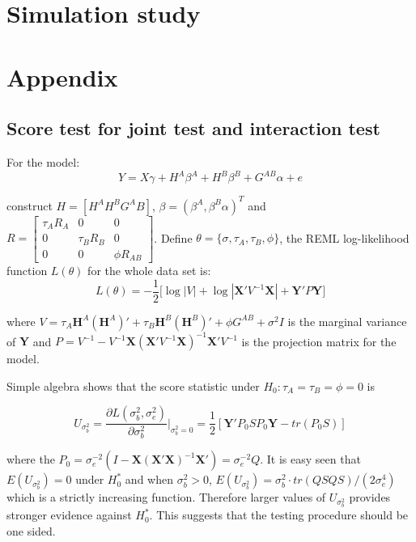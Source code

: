 \documentclass{article}
\newcommand{\Y}{\mathbf{Y}}
\newcommand{\X}{\mathbf{X}}
\newcommand{\HH}{\mathbf{H}}
\begin{document}
    \section{Simulation study}



    \section{Appendix}

        \subsection{Score test for joint test and interaction test}

            For the model:
            \begin{equation*}
                Y=X\gamma+H^A\beta^A+H^B\beta^B+G^{AB}\alpha+e
            \end{equation*}

            construct $H=[H^A H^B G^AB]$, $\beta=(\beta^A, \beta^B \alpha)^T$ and $R=\begin{bmatrix}\tau_A R_A&0&0\\0&\tau_B R_B &0\\0&0&\phi R_{AB} \end{bmatrix} $.
            Define $\theta=\{\sigma,\tau_A,\tau_B,\phi\}$, the REML log-likelihood function $L(\theta)$ for the whole data set is:
            \[
                L(\theta)=-\frac{1}{2}\bigg[\log|V|+\log|\X'V^{-1}\X|+\Y'P\Y\bigg]
            \]

             where $V=\tau_A\HH^A (\HH^A)'+\tau_B \HH^B (\HH^B)'+\phi G^{AB}+\sigma^2I$ is the marginal variance of $\Y$ and $P=V^{-1}-V^{-1}\X(\X'V^{-1}\X)^{-1}\X'V^{-1}$ is the projection matrix for the model.

            Simple algebra shows that the score statistic under $H_0:\tau_A=\tau_B=\phi=0$ is

            \[
                U_{\sigma^2_b}=\frac{\partial L(\sigma^2_b,\sigma^2_e)}{\partial \sigma^2_b}\bigg|_{\sigma^2_b=0}=\frac{1}{2}[\Y'P_0SP_0\Y-tr(P_0S)]
            \]

            where the $P_0=\sigma^{-2}_e(I-\X(\X'\X)^{-1}\X')=\sigma^{-2}_eQ$. It is easy seen that $E(U_{\sigma^2_b})=0$ under $H_0^*$ and when $\sigma^2_b>0$, $E(U_{\sigma^2_b})=\sigma^2_b\cdot tr(QSQS)/(2\sigma^4_e)$ which is a strictly increasing function. Therefore larger values of $U_{\sigma_b^2}$ provides stronger evidence against $H_0^*$. This suggests that the testing procedure should be one sided.
\end{document}
